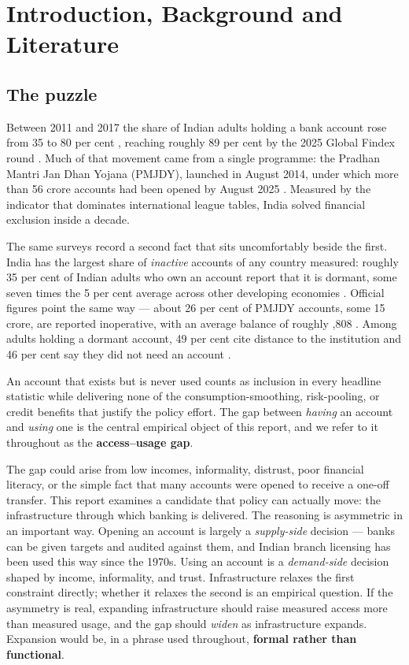 \chapter{Introduction, Background and Literature}
\label{ch:intro}

\section{The puzzle}
\label{sec:puzzle}

Between 2011 and 2017 the share of Indian adults holding a bank account rose from 35 to 80 per
cent \citep{findex2021}, reaching roughly 89 per cent by the 2025 Global Findex round
\citep{findex2025}. Much of that movement came from a single programme: the Pradhan Mantri Jan Dhan
Yojana (PMJDY), launched in August 2014, under which more than 56 crore accounts had been opened by
August 2025 \citep{pmjdy2025}. Measured by the indicator that dominates international league
tables, India solved financial exclusion inside a decade.

The same surveys record a second fact that sits uncomfortably beside the first. India has the
largest share of \emph{inactive} accounts of any country measured: roughly 35 per cent of Indian
adults who own an account report that it is dormant, some seven times the 5 per cent average across
other developing economies \citep{findex2021}. Official figures point the same way --- about 26 per
cent of PMJDY accounts, some 15 crore, are reported inoperative, with an average balance of roughly
,808 \citep{pmjdy2025}. Among adults holding a dormant account, 49 per cent cite distance to
the institution and 46 per cent say they did not need an account \citep{findex2021}.

An account that exists but is never used counts as inclusion in every headline statistic while
delivering none of the consumption-smoothing, risk-pooling, or credit benefits that justify the
policy effort. The gap between \emph{having} an account and \emph{using} one is the central
empirical object of this report, and we refer to it throughout as the \textbf{access--usage gap}.

The gap could arise from low incomes, informality, distrust, poor financial literacy, or the simple
fact that many accounts were opened to receive a one-off transfer. This report examines a candidate
that policy can actually move: the infrastructure through which banking is delivered. The reasoning
is asymmetric in an important way. Opening an account is largely a \emph{supply-side} decision ---
banks can be given targets and audited against them, and Indian branch licensing has been used this
way since the 1970s. Using an account is a \emph{demand-side} decision shaped by income,
informality, and trust. Infrastructure relaxes the first constraint directly; whether it relaxes
the second is an empirical question. If the asymmetry is real, expanding infrastructure should raise
measured access more than measured usage, and the gap should \emph{widen} as infrastructure
expands. Expansion would be, in a phrase used throughout, \textbf{formal rather than functional}.

